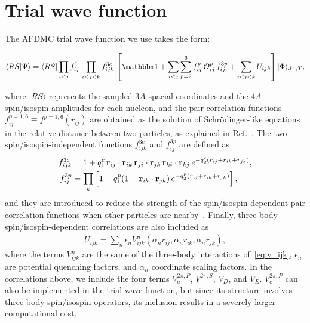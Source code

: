 \documentclass[aps,prc,twocolumn,superscriptaddress,floatfix]{revtex4-1}
\begin{document}
\section{Trial wave function}
\label{sec:wf}
The AFDMC trial wave function we use takes the form:
\begin{widetext}
\begin{align}
\langle RS|\Psi\rangle=\langle RS|\prod_{i<j}f^1_{ij}\,\prod_{i<j<k}f^{3c}_{ijk}\,
\left[\mathbbm1+\sum_{i<j}\sum_{p=2}^6 f^p_{ij}\,\mathcal O_{ij}^p\, f_{ij}^{3p}
+\sum_{i<j<k}U_{ijk}\right]|\Phi\rangle_{J^\pi,T} ,
\label{eq:psi}
\end{align}
\end{widetext}
where $|RS\rangle$ represents the sampled $3A$ spacial coordinates and the $4A$ spin/isospin amplitudes
for each nucleon, and the pair correlation functions $f^{p=1,6}_{ij}\equiv f^{p=1,6}(r_{ij})$ are obtained as the solution
of Schr\"odinger-like equations in the relative distance between two particles, as explained in Ref.~\cite{Carlson:2015}. 
The two spin/isospin-independent functions $f^{3c}_{ijk}$ and $f^{3p}_{ij}$ are defined as
\begin{align}
f^{3c}_{ijk}&=1+q_1^c\,\vb{r}_{ij}\cdot\vb{r}_{ik}\,\vb{r}_{ji}\cdot\vb{r}_{jk}\,
\vb{r}_{ki}\cdot\vb{r}_{kj}\,e^{-q_2^c(r_{ij}+r_{ik}+r_{jk})} ,
\nonumber \\
f_{ij}^{3p}&=\prod_k\left[1-q_1^p(1-\vb{r}_{ik}\cdot\vb{r}_{jk})\,e^{-q_2^p(r_{ij}+r_{ik}+r_{jk})}\right] ,
\end{align}
and they are introduced to reduce the strength of the spin/isospin-dependent pair correlation functions when 
other particles are nearby~\cite{Pudliner:1997}.
Finally, three-body spin/isospin-dependent correlations are also included as 
\begin{align}
U_{ijk}=\sum_n \epsilon_n V_{ijk}^n(\alpha_n r_{ij},\alpha_n r_{ik},\alpha_n r_{jk}) ,
\end{align}
where the terms $V^n_{ijk}$ are the same of the three-body interactions of~\cref{eq:v_ijk}, 
$\epsilon_n$ are potential quenching factors, and $\alpha_n$ coordinate scaling factors.
In the correlations above, we include the four terms $V_a^{2\pi,P}$, $V^{2\pi,S}$,
$V_D$, and $V_E$. $V_c^{2\pi,P}$ can also be implemented in the trial wave function,
but since its structure involves three-body spin/isospin operators, its inclusion 
results in a severely larger computational cost.
\end{document}
